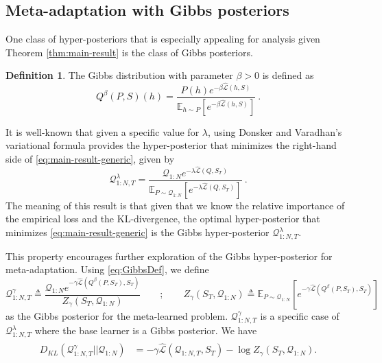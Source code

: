 \documentclass{article} %
\theoremstyle{definition}
\newtheorem{defn}{Definition}[section]
\newcommand{\Expect}[2]{\mathbb{E}_{#1}\left [#2 \right ]}
\begin{document}
\subsection{Meta-adaptation with Gibbs posteriors} \label{sec:adapt-gibbs}

One class of hyper-posteriors that is especially appealing for analysis given Theorem \ref{thm:main-result} is the class of Gibbs posteriors.

\begin{defn} \label{defn:Gibbs}
	The Gibbs distribution with parameter $\beta>0$ is defined as 
	\begin{equation}\label{eq:GibbsDef}
	    Q^\beta(P,S)(h)=\frac{P(h)e^{-\beta \hat{\mathcal{L}}(h,S)}}{\Expect{h\sim P}{e^{-\beta\hat{\mathcal{L}}(h,S)}}}~.
	\end{equation}
\end{defn}

It is well-known \citep{Catoni2004} that given a specific value for $\lambda$, using Donsker and Varadhan’s variational formula \citep{Donsker1975} provides the hyper-posterior that minimizes the right-hand side of \eqref{eq:main-result-generic}, given by
%
\begin{equation*}
    \mathcal{Q}^{\lambda}_{1:N,T}=\frac{\mathcal{Q}_{1:N}e^{-\lambda\hat{\mathcal{L}}(Q,S_T)}}{\Expect{P\sim \mathcal{Q}_{1:N}}{e^{-\lambda\hat{\mathcal{L}}(Q,S_T)}}}~.
\end{equation*}
The meaning of this result is that given that we know the relative importance of the empirical loss and the KL-divergence, the optimal hyper-posterior that minimizes \eqref{eq:main-result-generic} is the Gibbs hyper-posterior $\mathcal{Q}^{\lambda}_{1:N,T}$.

This property encourages further exploration of the Gibbs hyper-posterior for meta-adaptation. Using \eqref{eq:GibbsDef}, we define 
\begin{equation} \label{eq:aml-post-defn}
\mathcal{Q}^{\gamma}_{1:N,T}\triangleq \frac{\mathcal{Q}_{1:N}e^{-\gamma\hat{\mathcal{L}}(Q^\beta(P,S_T),S_T)}}{Z_\gamma(S_T, \mathcal{Q}_{1:N})} \qquad ; \qquad Z_\gamma(S_T, \mathcal{Q}_{1:N})\triangleq \Expect{P\sim \mathcal{Q}_{1:N}}{e^{-\gamma\hat{\mathcal{L}}(Q^\beta(P,S_T),S_T)}}
\end{equation} 
as the Gibbs posterior for the meta-learned problem. 
$\mathcal{Q}^{\gamma}_{1:N,T}$ is a specific case of $\mathcal{Q}^{\lambda}_{1:N,T}$ where the base learner is a Gibbs posterior.
We have 
\begin{align*} 
\begin{split}
D_{KL}(\mathcal{Q}^{\gamma}_{1:N,T}||\mathcal{Q}_{1:N})&=
-\gamma\hat{\mathcal{L}}(\mathcal{Q}_{1:N,T}, S_T)
-\log Z_\gamma(S_T, \mathcal{Q}_{1:N}) .
\end{split}
\end{align*}
\end{document}
